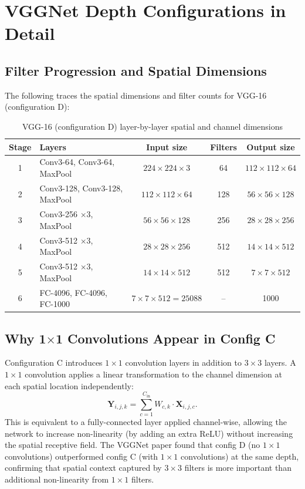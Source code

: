 \documentclass[12pt,a4paper]{article}
\begin{document}
\section{VGGNet Depth Configurations in Detail}
\label{sec:vgg_detail}

\subsection{Filter Progression and Spatial Dimensions}

The following traces the spatial dimensions and filter counts for VGG-16 (configuration D):

\begin{table}[ht]
\centering
\caption{VGG-16 (configuration D) layer-by-layer spatial and channel dimensions}
\label{tab:vgg16_detail}
\small
\begin{tabular}{@{}clccc@{}}
\toprule
Stage & Layers & Input size & Filters & Output size \\
\midrule
1 & Conv3-64, Conv3-64, MaxPool & $224\times224\times3$   & 64  & $112\times112\times64$ \\
2 & Conv3-128, Conv3-128, MaxPool & $112\times112\times64$  & 128 & $56\times56\times128$ \\
3 & Conv3-256 $\times3$, MaxPool & $56\times56\times128$   & 256 & $28\times28\times256$ \\
4 & Conv3-512 $\times3$, MaxPool & $28\times28\times256$   & 512 & $14\times14\times512$ \\
5 & Conv3-512 $\times3$, MaxPool & $14\times14\times512$   & 512 & $7\times7\times512$ \\
6 & FC-4096, FC-4096, FC-1000    & $7\times7\times512=25088$ & -- & 1000 \\
\bottomrule
\end{tabular}
\end{table}

\subsection{Why 1$\times$1 Convolutions Appear in Config C}

Configuration C introduces $1\times1$ convolution layers in addition to $3\times3$ layers. A $1\times1$ convolution applies a linear transformation to the channel dimension at each spatial location independently:
\begin{equation}
  \mathbf{Y}_{i,j,k} = \sum_{c=1}^{C_{\text{in}}} W_{c,k} \cdot \mathbf{X}_{i,j,c}.
  \label{eq:1x1conv}
\end{equation}
This is equivalent to a fully-connected layer applied channel-wise, allowing the network to increase non-linearity (by adding an extra ReLU) without increasing the spatial receptive field. The VGGNet paper found that config D (no $1\times1$ convolutions) outperformed config C (with $1\times1$ convolutions) at the same depth, confirming that spatial context captured by $3\times3$ filters is more important than additional non-linearity from $1\times1$ filters.
\end{document}
